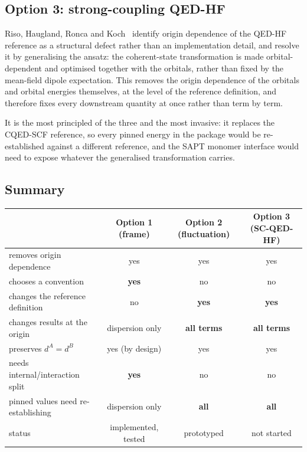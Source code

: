 \documentclass[11pt]{article}
\begin{document}
\subsection{Option 3: strong-coupling QED-HF}

Riso, Haugland, Ronca and Koch~\cite{Riso2022} identify origin dependence of the
QED-HF reference as a structural defect rather than an implementation detail,
and resolve it by generalising the ansatz: the coherent-state transformation is
made orbital-dependent and optimised together with the orbitals, rather than
fixed by the mean-field dipole expectation. This removes the origin dependence
of the orbitals and orbital energies themselves, at the level of the reference
definition, and therefore fixes every downstream quantity at once rather than
term by term.

It is the most principled of the three and the most invasive: it replaces the
CQED-SCF reference, so every pinned energy in the package would be
re-established against a different reference, and the SAPT monomer interface
would need to expose whatever the generalised transformation carries.

\subsection{Summary}

\begin{center}
\small
\renewcommand{\arraystretch}{1.25}
\begin{tabular}{lccc}
\toprule
& Option 1 (frame) & Option 2 (fluctuation) & Option 3 (SC-QED-HF) \\
\midrule
removes origin dependence & yes & yes & yes \\
chooses a convention & \textbf{yes} & no & no \\
changes the reference definition & no & \textbf{yes} & \textbf{yes} \\
changes results at the origin & dispersion only & \textbf{all terms} & \textbf{all terms} \\
preserves $d^A = d^B$ & yes (by design) & yes & yes \\
needs internal/interaction split & \textbf{yes} & no & no \\
pinned values need re-establishing & dispersion only & \textbf{all} & \textbf{all} \\
status & implemented, tested & prototyped & not started \\
\bottomrule
\end{tabular}
\end{center}
\end{document}
